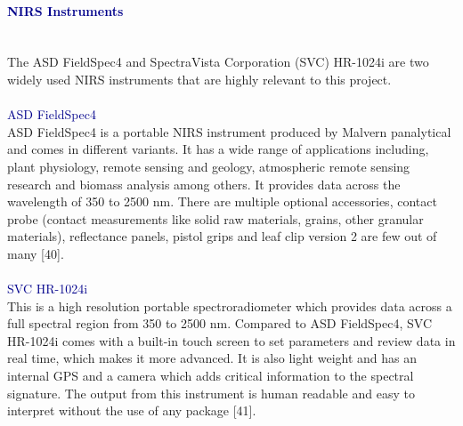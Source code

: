 \documentclass[12pt,a4paper]{report}
\begin{document}
\paragraph{\textbf{\textcolor{darkblue}{NIRS Instruments}}}\\
The ASD FieldSpec4 and SpectraVista Corporation (SVC) HR-1024i are two widely used NIRS instruments that are highly relevant to this project. \\
\\
\textcolor{darkblue}{ASD FieldSpec4}\\
ASD FieldSpec4 is a portable NIRS instrument produced by  Malvern panalytical and comes in different variants. It has a wide range of applications including, plant physiology, remote sensing and geology, atmospheric remote sensing research and biomass analysis among others. It provides data across the wavelength of 350 to 2500 nm. There are multiple optional accessories, contact probe (contact measurements like solid raw materials, grains, other granular materials), reflectance panels, pistol grips and leaf clip version 2 are few out of many [40]. \\
\\
\textcolor{darkblue}{SVC HR-1024i}\\
This is a high resolution portable spectroradiometer which provides data across a full spectral region from 350 to 2500 nm. Compared to ASD FieldSpec4, SVC HR-1024i comes with a built-in touch screen to set parameters and review data in real time, which makes it more advanced. It is also light weight and has an internal GPS and a camera which adds critical information to the spectral signature. The output from this instrument is human readable and easy to interpret without the use of any package [41]. \\
\end{document}
